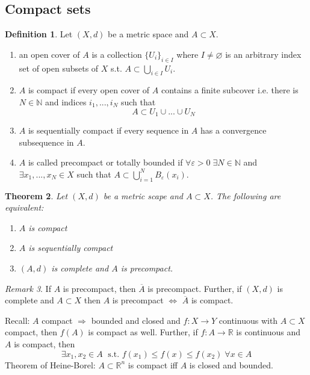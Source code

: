 \documentclass[a4paper, 12pt]{article}
\theoremstyle{plain}
\newtheorem{theorem}{Theorem}[subsection] %
\theoremstyle{definition}
\newtheorem{definition}[theorem]{Definition} %
\theoremstyle{lemma}
\theoremstyle{remark}
\newtheorem{remark}[theorem]{Remark}
\theoremstyle{corollary}
\theoremstyle{example}
\begin{document}
	\subsection{Compact sets}
	\begin{definition}
		Let $(X,d)$ be a metric space and $A \subset X$. 
		\begin{enumerate}
			\item an open cover of $A$ is a collection $\{U_i\}_{i \in I}$ where $I\neq \varnothing$ is an arbitrary index set of open subsets of $X$ s.t. $A \subset \bigcup\limits_{i \in I} U_i$.
			\item $A$ is compact if every open cover of $A$ contains a finite subcover i.e. there is $N \in \mathbb{N}$ and indices $i_1,...,i_N$ such that \[A \subset U_1 \cup ... \cup U_N\]
			\item $A$ is sequentially compact if every sequence in $A$ has a convergence subsequence in $A$.
			\item $A$ is called precompact or totally bounded if $\forall \varepsilon > 0 \; \exists N \in \mathbb{N}$ and $\exists x_1,...,x_N \in X$ such that $A \subset \bigcup_{i = 1}^N B_\varepsilon(x_i)$.
		\end{enumerate}
	\end{definition}

	\begin{theorem}
		Let $(X,d)$ be a metric scape and $A \subset X$. The following are equivalent:
		\begin{enumerate}
			\item $A$ is compact
			\item $A$ is sequentially compact
			\item $(A,d)$ is complete and $A$ is precompact.
		\end{enumerate}
	\end{theorem}

	\begin{remark}
		If $A$ is precompact, then $\overline{A}$ is precompact. Further, if $(X,d)$ is complete and $A\subset X$ then $A$ is precompact $\Leftrightarrow$ $\overline{A}$ is compact.
	\end{remark}

	Recall: $A$ compact $\Rightarrow$ bounded and closed and $f: X \to Y$ continuous with $A \subset X$ compact, then $f(A)$ is compact as well. Further, if $f:A \to \mathbb{R}$ is continuous and $A$ is compact, then \[\exists x_1, x_2 \in A \; \text{ s.t. } f(x_1) \leq f(x) \leq f(x_2) \; \forall x \in A\]
	Theorem of Heine-Borel: $A \subset \mathbb{R}^n$ is compact iff $A$ is closed and bounded.
\end{document}
